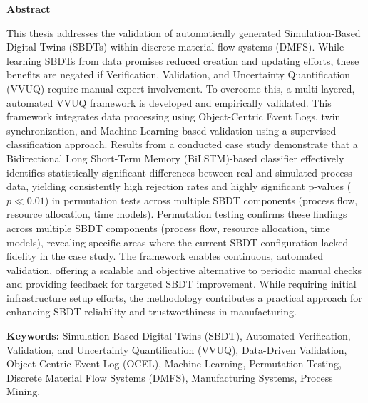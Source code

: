 \thispagestyle{plain} %

\vspace*{1.5in} %

\begin{center}
  {\Large \textbf{Abstract}}
\end{center}

This thesis addresses the validation of automatically generated Simulation-Based Digital Twins (SBDTs) within discrete material flow systems (DMFS). While learning SBDTs from data promises reduced creation and updating efforts, these benefits are negated if Verification, Validation, and Uncertainty Quantification (VVUQ) require manual expert involvement. To overcome this, a multi-layered, automated VVUQ framework is developed and empirically validated. This framework integrates data processing using Object-Centric Event Logs, twin synchronization, and Machine Learning-based validation using a supervised classification approach. Results from a conducted case study demonstrate that a Bidirectional Long Short-Term Memory (BiLSTM)-based classifier effectively identifies statistically significant differences between real and simulated process data, yielding consistently high rejection rates and highly significant p-values ($p \ll 0.01$) in permutation tests across multiple SBDT components (process flow, resource allocation, time models). Permutation testing confirms these findings across multiple SBDT components (process flow, resource allocation, time models), revealing specific areas where the current SBDT configuration lacked fidelity in the case study. The framework enables continuous, automated validation, offering a scalable and objective alternative to periodic manual checks and providing feedback for targeted SBDT improvement. While requiring initial infrastructure setup efforts, the methodology contributes a practical approach for enhancing SBDT reliability and trustworthiness in manufacturing.

\vspace{0.3in}

\textbf{Keywords:} Simulation-Based Digital Twins (SBDT), Automated Verification, Validation, and Uncertainty Quantification (VVUQ), Data-Driven Validation, Object-Centric Event Log (OCEL), Machine Learning, Permutation Testing, Discrete Material Flow Systems (DMFS), Manufacturing Systems, Process Mining.

\clearpage